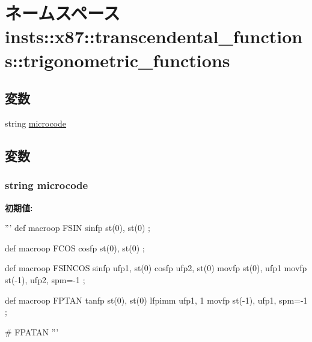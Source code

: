 \hypertarget{namespaceinsts_1_1x87_1_1transcendental__functions_1_1trigonometric__functions}{
\section{ネームスペース insts::x87::transcendental\_\-functions::trigonometric\_\-functions}
\label{namespaceinsts_1_1x87_1_1transcendental__functions_1_1trigonometric__functions}
}
\subsection*{変数}
\begin{DoxyCompactItemize}
\item 
string \hyperlink{namespaceinsts_1_1x87_1_1transcendental__functions_1_1trigonometric__functions_a770f11a173e99389a8802f0107ed8f52}{microcode}
\end{DoxyCompactItemize}


\subsection{変数}
\hypertarget{namespaceinsts_1_1x87_1_1transcendental__functions_1_1trigonometric__functions_a770f11a173e99389a8802f0107ed8f52}{
\subsubsection[{microcode}]{\setlength{\rightskip}{0pt plus 5cm}string {\bf microcode}}}
\label{namespaceinsts_1_1x87_1_1transcendental__functions_1_1trigonometric__functions_a770f11a173e99389a8802f0107ed8f52}
{\bfseries 初期値:}
\begin{DoxyCode}
'''
def macroop FSIN {
    sinfp st(0), st(0)
};

def macroop FCOS {
    cosfp st(0), st(0)
};

def macroop FSINCOS {
    sinfp ufp1, st(0)
    cosfp ufp2, st(0)
    movfp st(0), ufp1
    movfp st(-1), ufp2, spm=-1
};

def macroop FPTAN {
    tanfp st(0), st(0)
    lfpimm ufp1, 1
    movfp st(-1), ufp1, spm=-1
};

# FPATAN
'''
\end{DoxyCode}

